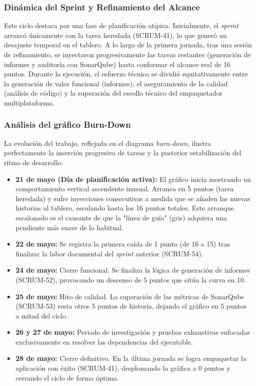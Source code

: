 \subsubsection{Dinámica del Sprint y Refinamiento del Alcance}
Este ciclo destaca por una fase de planificación atípica. Inicialmente, el \textit{sprint} arrancó únicamente con la tarea heredada (SCRUM-41), lo que generó un desajuste temporal en el tablero. A lo largo de la primera jornada, tras una sesión de refinamiento, se inyectaron progresivamente las tareas restantes (generación de informes y auditoría con SonarQube) hasta conformar el alcance real de 16 puntos. Durante la ejecución, el esfuerzo técnico se dividió equitativamente entre la generación de valor funcional (informes), el aseguramiento de la calidad (análisis de código) y la superación del escollo técnico del empaquetador multiplataforma.

\subsubsection{Análisis del gráfico Burn-Down}

La evolución del trabajo, reflejada en el diagrama \textit{burn-down}, ilustra perfectamente la inserción progresiva de tareas y la posterior estabilización del ritmo de desarrollo:

\begin{itemize}
    \item \textbf{21 de mayo (Día de planificación activa):} El gráfico inicia mostrando un comportamiento vertical ascendente inusual. Arranca en 5 puntos (tarea heredada) y sufre inyecciones consecutivas a medida que se añaden las nuevas historias al tablero, escalando hasta los 16 puntos totales. Este arranque escalonado es el causante de que la "línea de guía" (gris) adquiera una pendiente más suave de lo habitual.
    \item \textbf{22 de mayo:} Se registra la primera caída de 1 punto (de 16 a 15) tras finalizar la labor documental del \textit{sprint} anterior (SCRUM-54).
    \item \textbf{24 de mayo:} Cierre funcional. Se finaliza la lógica de generación de informes (SCRUM-52), provocando un descenso de 5 puntos que sitúa la curva en 10.
    \item \textbf{25 de mayo:} Hito de calidad. La superación de las métricas de SonarQube (SCRUM-53) resta otros 5 puntos de historia, dejando el gráfico en 5 puntos a mitad del ciclo.
    \item \textbf{26 y 27 de mayo:} Periodo de investigación y pruebas exhaustivas enfocadas exclusivamente en resolver las dependencias del ejecutable.
    \item \textbf{28 de mayo:} Cierre definitivo. En la última jornada se logra empaquetar la aplicación con éxito (SCRUM-41), desplomando la gráfica a 0 puntos y cerrando el ciclo de forma óptima.
\end{itemize}

